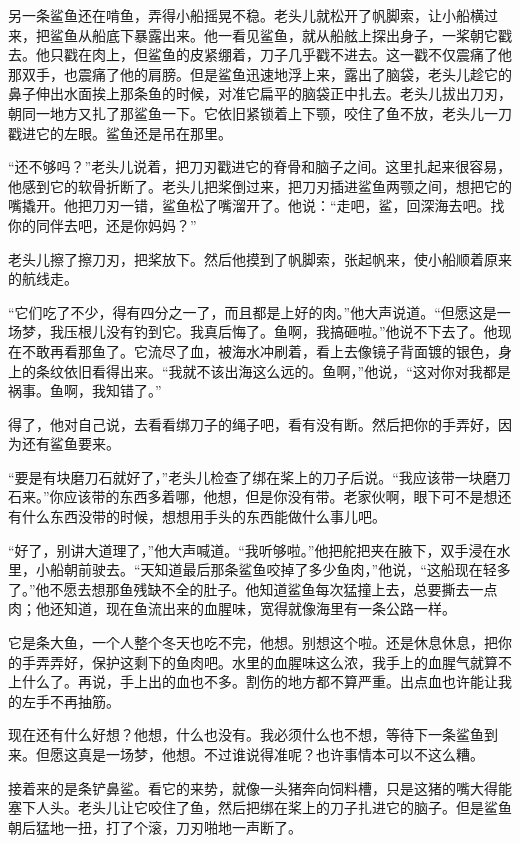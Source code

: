 \documentclass[12pt,UTF-8,openany]{ctexbook}
\begin{document}
\begin{normalsize}
    另一条鲨鱼还在啃鱼，弄得小船摇晃不稳。老头儿就松开了帆脚索，让小船横过来，把鲨鱼从船底下暴露出来。他一看见鲨鱼，就从船舷上探出身子，一桨朝它戳去。他只戳在肉上，但鲨鱼的皮紧绷着，刀子几乎戳不进去。这一戳不仅震痛了他那双手，也震痛了他的肩膀。但是鲨鱼迅速地浮上来，露出了脑袋，老头儿趁它的鼻子伸出水面挨上那条鱼的时候，对准它扁平的脑袋正中扎去。老头儿拔出刀刃，朝同一地方又扎了那鲨鱼一下。它依旧紧锁着上下颚，咬住了鱼不放，老头儿一刀戳进它的左眼。鲨鱼还是吊在那里。
    
    “还不够吗？”老头儿说着，把刀刃戳进它的脊骨和脑子之间。这里扎起来很容易，他感到它的软骨折断了。老头儿把桨倒过来，把刀刃插进鲨鱼两颚之间，想把它的嘴撬开。他把刀刃一错，鲨鱼松了嘴溜开了。他说：“走吧，鲨，回深海去吧。找你的同伴去吧，还是你妈妈？”
    
    老头儿擦了擦刀刃，把桨放下。然后他摸到了帆脚索，张起帆来，使小船顺着原来的航线走。
    
    “它们吃了不少，得有四分之一了，而且都是上好的肉。”他大声说道。“但愿这是一场梦，我压根儿没有钓到它。我真后悔了。鱼啊，我搞砸啦。”他说不下去了。他现在不敢再看那鱼了。它流尽了血，被海水冲刷着，看上去像镜子背面镀的银色，身上的条纹依旧看得出来。“我就不该出海这么远的。鱼啊，”他说，“这对你对我都是祸事。鱼啊，我知错了。”
    
    得了，他对自己说，去看看绑刀子的绳子吧，看有没有断。然后把你的手弄好，因为还有鲨鱼要来。
    
    “要是有块磨刀石就好了，”老头儿检查了绑在桨上的刀子后说。“我应该带一块磨刀石来。”你应该带的东西多着哪，他想，但是你没有带。老家伙啊，眼下可不是想还有什么东西没带的时候，想想用手头的东西能做什么事儿吧。
    
    “好了，别讲大道理了，”他大声喊道。“我听够啦。”他把舵把夹在腋下，双手浸在水里，小船朝前驶去。“天知道最后那条鲨鱼咬掉了多少鱼肉，”他说，“这船现在轻多了。”他不愿去想那鱼残缺不全的肚子。他知道鲨鱼每次猛撞上去，总要撕去一点肉；他还知道，现在鱼流出来的血腥味，宽得就像海里有一条公路一样。
    
    它是条大鱼，一个人整个冬天也吃不完，他想。别想这个啦。还是休息休息，把你的手弄弄好，保护这剩下的鱼肉吧。水里的血腥味这么浓，我手上的血腥气就算不上什么了。再说，手上出的血也不多。割伤的地方都不算严重。出点血也许能让我的左手不再抽筋。
    
    现在还有什么好想？他想，什么也没有。我必须什么也不想，等待下一条鲨鱼到来。但愿这真是一场梦，他想。不过谁说得准呢？也许事情本可以不这么糟。
    
    接着来的是条铲鼻鲨。看它的来势，就像一头猪奔向饲料槽，只是这猪的嘴大得能塞下人头。老头儿让它咬住了鱼，然后把绑在桨上的刀子扎进它的脑子。但是鲨鱼朝后猛地一扭，打了个滚，刀刃啪地一声断了。
    

\end{normalsize}
\end{document}
